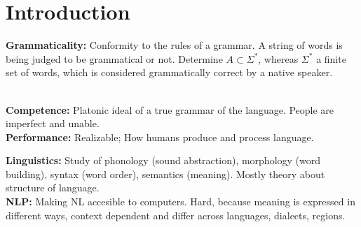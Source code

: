 \section{Introduction}
\textbf{Grammaticality:} Conformity to the rules of a grammar. A string of words is being judged to be grammatical or not. Determine $A\subset\Sigma^*$, whereas $\Sigma^*$ a finite set of words, which is considered grammatically correct by a native speaker.\\
\begin{comment}Grammatically correct has a lot to do with language intuition, since humans do not have the ability to perfectly speak a language. Native speakers have an intuition about what is correct or not.
\end{comment}\\ 
\textbf{Competence:} Platonic ideal of a true grammar of the language. People are imperfect and unable. \\
\textbf{Performance:} Realizable; How humans produce and process language. \\
\begin{comment}
	Syntacticians develop functions that take a string of words and outputs if it is grammatically correct or not. They care about complexity, finding the least complex formalism, in the Chompsky hierarchy, to achieve this function.
\end{comment}
\textbf{Linguistics:} Study of phonology (sound abstraction), morphology (word building), syntax (word order), semantics (meaning). Mostly theory about structure of language.\\
\textbf{NLP:} Making NL accesible to computers. Hard, because meaning is expressed in different ways, context dependent and differ across languages, dialects, regions.\\



